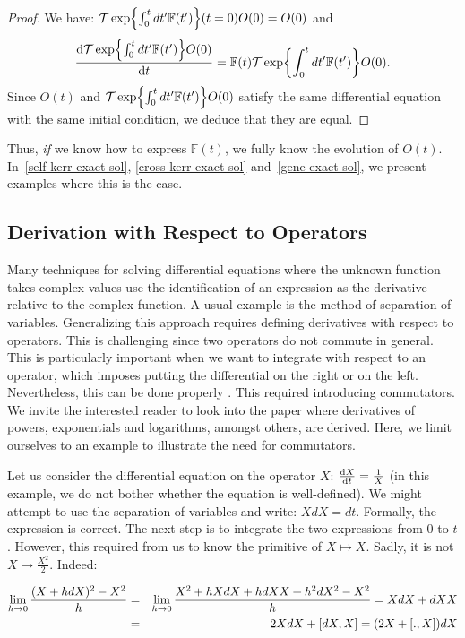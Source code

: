 \begin{proof}
    We have: $\mathcal{T}\exp{\int_{0}^t dt' \mathbb{F}(t')}(t=0) O(0) = O(0)$ and 
    $$\dv{\mathcal{T}\exp{\int_{0}^t dt' \mathbb{F}(t')} O(0)}{t} = \mathbb{F}(t) \mathcal{T}\exp{\int_{0}^t dt' \mathbb{F}(t')} O(0).$$ Since $O(t)$ and $\mathcal{T}\exp{\int_{0}^t dt' \mathbb{F}(t')} O(0)$ satisfy the same differential equation with the same initial condition, we deduce that they are equal.
\end{proof}

Thus, \textit{if} we know how to express $\mathbb{F}(t)$, we fully know the evolution of $O(t)$. In~\autoref{self-kerr-exact-sol}, \autoref{cross-kerr-exact-sol} and~\autoref{gene-exact-sol}, we present examples where this is the case.

\subsection{Derivation with Respect to Operators} \label{int-op}

Many techniques for solving differential equations where the unknown function takes complex values use the identification of an expression as the derivative relative to the complex function. A usual example is the method of separation of variables. Generalizing this approach requires defining derivatives with respect to operators. This is challenging since two operators do not commute in general. This is particularly important when we want to integrate with respect to an operator, which imposes putting the differential on the right or on the left. Nevertheless, this can be done properly \cite{Suzuki1997-zw}. This required introducing commutators. We invite the interested reader to look into the paper \cite{Suzuki1997-zw} where derivatives of powers, exponentials and logarithms, amongst others, are derived. Here, we limit ourselves to an example to illustrate the need for commutators.

Let us consider the differential equation on the operator $X$: $\dv{X}{t} = \frac{1}{X}$ (in this example, we do not bother whether the equation is well-defined). We might attempt to use the separation of variables and write: $X dX = dt$. Formally, the expression is correct. The next step is to integrate the two expressions from $0$ to $t$. However, this required from us to know the primitive of $X \mapsto X$. Sadly, it is not $X \mapsto \frac{X^2}{2}$. Indeed:

\begin{eqnarray}
    \lim_{h \rightarrow 0} \frac{(X + h dX)^2 - X^2}{h} &=& \lim_{h \rightarrow 0} \frac{X^2 + h X dX + h dX X + h^2 dX^2 - X^2}{h} = X dX + dX X \nonumber\\
    &=& 2 X dX + \commutator{dX}{X} = (2 X + \commutator{.}{X}) dX
\end{eqnarray}

